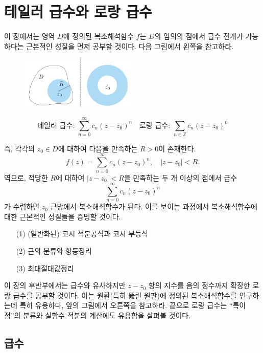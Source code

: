 
\chapter{테일러 급수와 로랑 급수}

이 장에서는 영역 $D$에 정의된 복소해석함수 $f$는 
$D$의 임의의 점에서 급수 전개가 가능하다는 근본적인 성질을 먼저 공부할 것이다.
다음 그림에서 왼쪽을 참고하라.
\begin{figure}[h!]
\begin{center}
\includegraphics[width=0.5\textwidth]{./SaltChapter/figs/fig-4-0-1}
\end{center}
\end{figure}
\[
\text{테일러 급수: } \sum_{n=0}^\infty c_n(z-z_0)^n 
\quad
\text{로랑 급수: } \sum_{n\in \mathbb Z} c_n(z-z_0)^n 
\]

즉, 각각의 $z_0 \in D$에 대하여 다음을 만족하는 $R>0$이 존재한다.
\[
f(z) = \sum_{n=0}^\infty c_n(z-z_0)^n, \quad |z-z_0| <R.
\]
역으로,  적당한 $R$에 대하여 $|z-z_0|<R$을 만족하는 두 개 이상의 점에서 급수
\[
\sum_{n=0}^\infty c_n(z-z_0)^n
\]
가 수렴하면 $z_0$ 근방에서 복소해석함수가 된다.  %
이를 보이는 과정에서 복소해석함수에 대한 근본적인 성질들을 증명할 것이다.
\begin{itemize}
\item[(1)] (일반화된) 코시 적분공식과 코시 부등식
\item[(2)] 근의 분류와 항등정리
\item[(3)] 최대절대값정리
\end{itemize}

이 장의 후반부에서는
급수와 유사하지만 $z-z_0$ 항의 지수를 음의 정수까지 확장한
로랑 급수를 공부할 것이다.
이는 원환(특히 뚫린 원판)에 정의된 복소해석함수를 연구하는데 특히 유용하다,
앞의 그림에서 오른쪽을 참고하라.
끝으로 로랑 급수는 ``특이점''의 분류와 실함수 적분의 계산에도 유용함을 살펴볼 것이다.

\section{급수}

